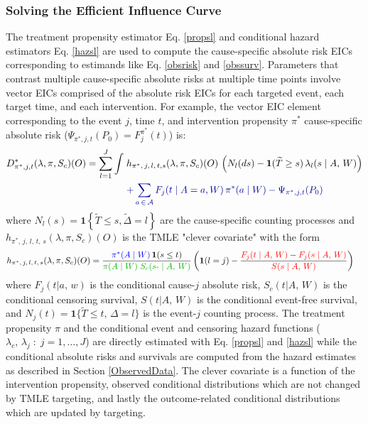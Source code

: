 \documentclass{report}
\newcommand{\1}{\ensuremath{\mathbf{1}}}
\newcommand{\T}{\ensuremath{\widetilde{T}}}
\newcommand{\X}{\ensuremath{{W}}}
\newcommand{\ax}{\ensuremath{\mid a,\,{w}}}
\newcommand{\AX}{\ensuremath{\mid A,\,{W}}}
\newcommand{\trt}{\ensuremath{\pi^*}}
\newcommand{\lj}{\ensuremath{l}}
\newcommand{\jj}{\ensuremath{j}}
\newcommand{\g}{\ensuremath{\pi}}
\newcommand{\tDelta}{\ensuremath{\widetilde{\Delta}}}
\begin{document}
\subsubsection{Solving the Efficient Influence Curve}
\label{EIC}
The treatment propensity estimator Eq. \eqref{propsl} and conditional hazard estimators Eq. \eqref{hazsl} are used to compute the cause-specific absolute risk EICs corresponding to estimands like Eq. \eqref{obsrisk} and \eqref{obssurv}. Parameters that contrast multiple cause-specific absolute risks at multiple time points involve vector EICs comprised of the absolute risk EICs for each targeted event, each target time, and each intervention. For example, the vector EIC element corresponding to the event \(\jj\), time \(t\), and intervention propensity \(\trt\) cause-specific absolute risk (\(\Psi_{\trt, \jj, t}(P_0) = F_\jj^{\trt}(t)\)) is:
\begin{align}
    D^*_{\trt, \jj, t}(\lambda, \g, S_c)(O) = \sum_{\lj = 1}^{J} \int \; &h_{\trt,\, \jj,\, \lj,\, t, s}(\lambda, \g, S_c)(O) \, \left(N_{\lj}(ds) - \1(\T \geq s) \, \lambda_\lj(s \AX)\right) \label{eic} \\
    &{\color{blue!60!black}+ \sum_{a\,\in\,\mathcal{A}} F_\jj(t \mid A = a, \X)\,\trt(a \mid \X) - \Psi_{\trt, \jj, t}(P_0)}  \nonumber 
\end{align}
where \(N_l(s) = \1\left\{\T \leq s, \tDelta = l\right\}\) are the cause-specific counting processes and \(h_{\trt,\, \jj,\, \lj,\, t,\, s}(\lambda, \g, S_c)(O)\) is the TMLE "clever covariate" with the form
\begin{align}
    h_{\trt,\, \jj,\, \lj,\, t,\, s}&(\lambda, \g, S_c)(O) = \frac{{\color{blue}\trt(A \mid \X)\,} \1(s \leq t)}{{\color{green!70!black}\g(A \mid \X) \;S_c(s\text{-} \AX)}} \, \bigg(\1(\lj = \jj) - \frac{{\color{red}F_\jj(t \AX)} - {\color{red} F_\jj(s \AX)}}{{\color{red} S(s \AX)}}\bigg) \label{clevcov}
\end{align}
where \(F_j(t \ax)\) is the conditional cause-\(j\) absolute risk, \(S_c(t \AX)\) is the conditional censoring survival, \(S(t \AX)\) is the conditional event-free survival, and \(N_j(t) = \1\{\T \leq t, \, \Delta = l\}\) is the event-\(j\) counting process. The treatment propensity \(\g\) and the conditional event and censoring hazard functions ( \(\lambda_c,\, \lambda_j \;:\;  j = 1, \dots, J\)) are directly estimated with Eq. \eqref{propsl} and \eqref{hazsl} while the conditional absolute risks and survivals are computed from the hazard estimates as described in Section \ref{ObservedData}. The clever covariate is a function of the {\color{blue}intervention propensity}, {\color{green!70!black}observed conditional distributions} which are not changed by TMLE targeting, and lastly the {\color{red}outcome-related conditional distributions} which are updated by targeting.
\end{document}
